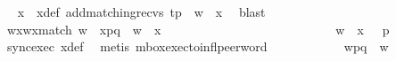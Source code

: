 \begin{isabellebody}
\ \isamarkupfalse%
\ x\ \ x{\isacharunderscore}{\kern0pt}def{\isacharcolon}{\kern0pt}\ {\isachardoublequoteopen}{\isacharparenleft}{\kern0pt}add{\isacharunderscore}{\kern0pt}matching{\isacharunderscore}{\kern0pt}recvs\ t{\isacharparenright}{\kern0pt}{\isasymdown}\isactrlsub p\ {\isacharequal}{\kern0pt}\ w\ {\isasymsqdot}\ x{\isachardoublequoteclose}\ \isamarkupfalse%
\ blast\isanewline
\ \ \ \ \ \ \ \ \ \ \isamarkupfalse%
\ \isamarkupfalse%
\ w{\isacharprime}{\kern0pt}x{\isacharprime}{\kern0pt}{\isacharunderscore}{\kern0pt}wx{\isacharunderscore}{\kern0pt}match{\isacharcolon}{\kern0pt}\ {\isachardoublequoteopen}{\isacharparenleft}{\kern0pt}w{\isacharprime}{\kern0pt}\ {\isasymsqdot}\ x{\isacharprime}{\kern0pt}{\isacharparenright}{\kern0pt}{\isasymdown}\isactrlsub {\isacharbang}{\kern0pt}{\isasymdown}\isactrlsub {\isacharbraceleft}{\kern0pt}\isactrlsub p\isactrlsub {\isacharcomma}{\kern0pt}\isactrlsub q\isactrlsub {\isacharbraceright}{\kern0pt}{\isasymdown}\isactrlsub {\isacharbang}{\kern0pt}\isactrlsub {\isacharquery}{\kern0pt}\ {\isacharequal}{\kern0pt}\ {\isacharparenleft}{\kern0pt}w\ {\isasymsqdot}\ x{\isacharparenright}{\kern0pt}{\isasymdown}\isactrlsub {\isacharquery}{\kern0pt}{\isasymdown}\isactrlsub {\isacharbang}{\kern0pt}\isactrlsub {\isacharquery}{\kern0pt}{\isachardoublequoteclose}\ \isamarkupfalse%
\isanewline
\ \ \ \ \ \ \ \ \ \ \ \ \ \ \isanewline
\ \ \ \ \ \ \ \ \ \ \isamarkupfalse%
\ {\isachardoublequoteopen}{\isacharparenleft}{\kern0pt}w\ {\isasymsqdot}\ x{\isacharparenright}{\kern0pt}\ {\isasymin}\ {\isasymL}\isactrlsup {\isacharasterisk}{\kern0pt}\ p{\isachardoublequoteclose}\ \isamarkupfalse%
\ sync{\isacharunderscore}{\kern0pt}exec\ x{\isacharunderscore}{\kern0pt}def\ \isamarkupfalse%
\ {\isacharparenleft}{\kern0pt}metis\ mbox{\isacharunderscore}{\kern0pt}exec{\isacharunderscore}{\kern0pt}to{\isacharunderscore}{\kern0pt}infl{\isacharunderscore}{\kern0pt}peer{\isacharunderscore}{\kern0pt}word{\isacharparenright}{\kern0pt}\isanewline
\ \ \ \ \ \ \ \ \ \ \isamarkupfalse%
\ {\isachardoublequoteopen}w{\isacharprime}{\kern0pt}{\isasymdown}\isactrlsub {\isacharbang}{\kern0pt}{\isasymdown}\isactrlsub {\isacharbraceleft}{\kern0pt}\isactrlsub p\isactrlsub {\isacharcomma}{\kern0pt}\isactrlsub q\isactrlsub {\isacharbraceright}{\kern0pt}{\isasymdown}\isactrlsub {\isacharbang}{\kern0pt}\isactrlsub {\isacharquery}{\kern0pt}\ {\isacharequal}{\kern0pt}\ w{\isasymdown}\isactrlsub {\isacharquery}{\kern0pt}{\isasymdown}\isactrlsub {\isacharbang}{\kern0pt}\isactrlsub {\isacharquery}{\kern0pt}{\isachardoublequoteclose}\ \isamarkupfalse%

\end{isabellebody}
